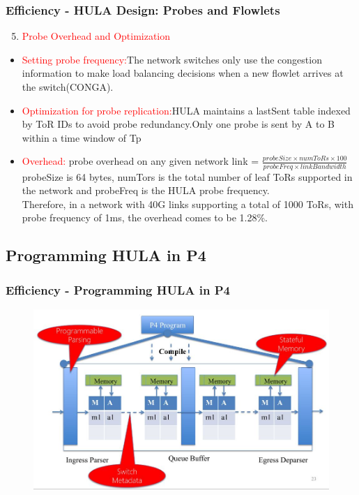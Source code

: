 \documentclass{beamer}
\begin{document}
\begin{frame}
	\frametitle{Efficiency - HULA Design: Probes and Flowlets}
	\begin{enumerate}
		\setcounter{enumi}{4}
		\item\textcolor{red}{Probe Overhead and Optimization}\\
	\end{enumerate}
	\begin{itemize}
		\item \textcolor{red}{Setting probe frequency:}The network switches only use the congestion information to make load balancing decisions when a new flowlet arrives at the switch(CONGA).
		\item \textcolor{red}{Optimization for probe replication:}HULA maintains a lastSent table indexed by ToR IDs to avoid probe redundancy.Only one probe is sent by A to B within a time window of Tp  
		\item \textcolor{red}{Overhead:} probe overhead on any given network link = ${\frac{probeSize\times numToRs\times100}{probeFreq\times linkBandwidth}}$\\
		probeSize is 64 bytes, numTors is the total number of leaf ToRs supported in the network and probeFreq is the HULA probe frequency.\\
		Therefore, in a network with 40G links supporting a total of 1000 ToRs, with probe frequency of 1ms, the overhead comes to be 1.28\%.
	\end{itemize}
\end{frame}


\subsection{Programming HULA in P4}
\begin{frame}
	\frametitle{Efficiency - Programming HULA in P4}
	\begin{figure}
		\includegraphics[width=1\linewidth]{14}
	\end{figure}
\end{frame}
\end{document}
